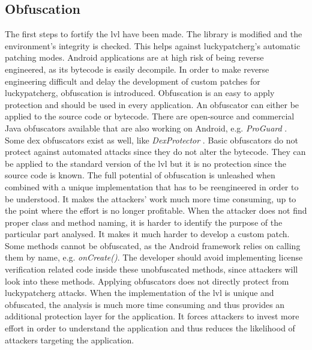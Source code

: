 \subsection{Obfuscation} \label{subsection:counter-improve-obfuscation}
The first steps to fortify the \gls{lvl} have been made.
The library is modified and the environment's integrity is checked.
This helps against \gls{luckypatcherg}'s automatic patching modes.
Android applications are at high risk of being reverse engineered, as its bytecode is easily decompile.
In order to make reverse engineering difficult and delay the development of custom patches for \gls{luckypatcherg}, obfuscation is introduced.
\newline
Obfuscation is an easy to apply protection and should be used in every application.
An obfuscator can either be applied to the source code or bytecode.
There are open-source and commercial Java obfuscators available that are also working on Android, e.g. \textit{ProGuard} \cite{proguard}.
Some dex obfuscators exist as well, like \textit{DexProtector} \cite{dexProtector}.
\newline
Basic obfuscators do not protect against automated attacks since they do not alter the bytecode.
They can be applied to the standard version of the \gls{lvl} but it is no protection since the source code is known.
The full potential of obfuscation is unleashed when combined with a unique implementation that has to be reengineered in order to be understood.
It makes the attackers' work much more time consuming, up to the point where the effort is no longer profitable.
When the attacker does not find proper class and method naming, it is harder to identify the purpose of the particular part analysed.
It makes it much harder to develop a custom patch. \cite{developersSecuring}
\newline
Some methods cannot be obfuscated, as the Android framework relies on calling them by name, e.g. \textit{onCreate()}.
The developer should avoid implementing license verification related code inside these unobfuscated methods, since attackers will look into these methods.
\cite{developersSecuring}
\newline
\newline
Applying obfuscators does not directly protect from \gls{luckypatcherg} attacks.
When the implementation of the \gls{lvl} is unique and obfuscated, the analysis is much more time consuming and thus provides an additional protection layer for the application.
It forces attackers to invest more effort in order to understand the application and thus reduces the likelihood of attackers targeting the application.
